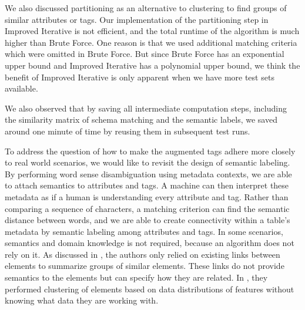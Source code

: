 We also discussed partitioning as an alternative to clustering to find groups of similar attributes or tags. Our implementation of the partitioning step in Improved Iterative is not efficient, and the total runtime of the algorithm is much higher than Brute Force. One reason is that we used additional matching criteria which were omitted in Brute Force. But since Brute Force has an exponential upper bound and Improved Iterative has a polynomial upper bound, we think the benefit of Improved Iterative is only apparent when we have more test sets available.

We also observed that by saving all intermediate computation steps, including the similarity matrix of schema matching and the semantic labels, we saved around one minute of time by reusing them in subsequent test runs.

To address the question of how to make the augmented tags adhere more closely to real world scenarios, we would like to revisit the design of semantic labeling. By performing word sense disambiguation using metadata contexts, we are able to attach semantics to attributes and tags. A machine can then interpret these metadata as if a human is understanding every attribute and tag. Rather than comparing a sequence of characters, a matching criterion can find the semantic distance between words, and we are able to create connectivity within a table's metadata by semantic labeling among attributes and tags. In some scenarios, semantics and domain knowledge is not required, because an algorithm does not rely on it. As discussed in \cite{Yu2006Schema}, the authors only relied on existing links between elements to summarize groups of similar elements. These links do not provide semantics to the elements but can specify how they are related. In \cite{LI200049}, they performed clustering of elements based on data distributions of features without knowing what data they are working with.

